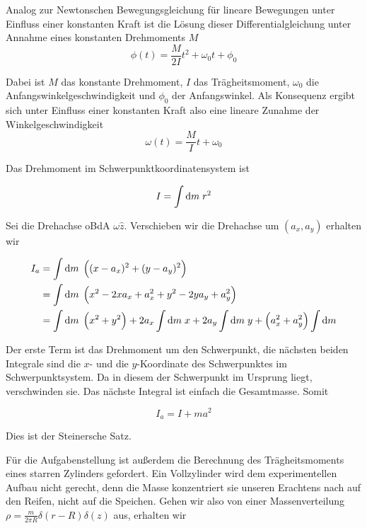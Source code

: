 \documentclass[a4paper,german,12pt,smallheadings]{scrartcl}
\begin{document}
Analog zur Newtonschen Bewegungsgleichung für lineare Bewegungen unter Einfluss
einer konstanten Kraft ist die Lösung dieser Differentialgleichung unter
Annahme eines konstanten Drehmoments $M$
\begin{equation}
  \phi(t) = \frac{M}{2I}t^2 + \omega_0 t + \phi_0
  \label{eq_of_motion}
\end{equation}

Dabei ist $M$ das konstante Drehmoment, $I$ das Trägheitsmoment, $\omega_0$ die
Anfangswinkelgeschwindigkeit und $\phi_0$ der Anfangswinkel. Als Konsequenz
ergibt sich unter Einfluss einer konstanten Kraft also eine lineare Zunahme der
Winkelgeschwindigkeit
\begin{equation}
  \omega(t) = \frac{M}{I} t + \omega_0
\end{equation}

Das Drehmoment im Schwerpunktkoordinatensystem ist

\begin{equation}
  I = \int \dif m \; r^2
  \label{speed}
\end{equation}

Sei die Drehachse oBdA $\omega \hat{z}$. Verschieben wir die Drehachse um
$(a_x, a_y)$ erhalten wir

\begin{align*}
  I_a &= \int \dif m \; \del{(x - a_x)^2 + (y - a_y)^2} \\
      &= \int \dif m \; \del{x^2 - 2xa_x + a_x^2 + y^2 - 2ya_y + a_y^2} \\
      &= \int \dif m \; \del{x^2 + y^2}
       + 2 a_x \int \dif m \; x
       + 2 a_y \int \dif m \; y
       + \del{a_x^2 + a_y^2} \int \dif m
\end{align*}

Der erste Term ist das Drehmoment um den Schwerpunkt, die nächsten beiden
Integrale sind die $x$- und die $y$-Koordinate des Schwerpunktes im
Schwerpunktsystem. Da in diesem der Schwerpunkt im Ursprung liegt, verschwinden
sie. Das nächste Integral ist einfach die Gesamtmasse. Somit

\begin{equation}
  I_a = I + ma^2
\end{equation}

Dies ist der Steinersche Satz.

Für die Aufgabenstellung ist außerdem die Berechnung des Trägheitsmoments eines
starren Zylinders gefordert. Ein Vollzylinder wird dem experimentellen Aufbau
nicht gerecht, denn die Masse konzentriert sie unseren Erachtens nach auf den
Reifen, nicht auf die Speichen. Gehen wir also von einer Massenverteilung $\rho
= \frac{m}{2 \pi R} \delta(r-R)\delta(z)$ aus, erhalten wir
\end{document}

